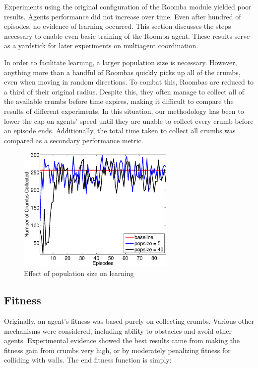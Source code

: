 \documentclass[conference]{IEEEtran}
\begin{document}
Experiments using the original configuration of the Roomba module yielded poor results. Agents performance did not increase over time.  Even after hundred of episodes, no evidence of learning occurred. This section discusses the steps necessary to enable even basic training of the Roomba agent. These results serve as a yardstick for later experiments on multiagent coordination.

In order to facilitate learning, a larger population size is necessary. However, anything more than a handful of Roombas quickly picks up all of the crumbs, even when moving in random directions. To combat this, Roombas are reduced to a third of their original radius. Despite this, they often manage to collect 
all of the available crumbs before time expires, making it difficult to compare the results of different experiments. In this situation, our methodology has been to lower the cap on agents' speed until they are unable to collect every crumb before an episode ends. Additionally, the total time taken to collect all crumbs was compared as a secondary performance metric.


\begin{figure}[!t]
\centering
\includegraphics[width=3.0in]{./figures/neroevolution/pop_size.eps}
\caption{Effect of population size on learning}
\label{neroevolution:pop_size}
\end{figure}




\subsection{Fitness}
Originally, an agent's fitness was based purely on collecting crumbs. Various other mechanisms were considered, including ability to obstacles and avoid other agents. Experimental evidence showed the best results came from making the fitness gain from crumbs very high, or by moderately penalizing fitness for colliding with walls. The end fitness function is simply:
\end{document}
